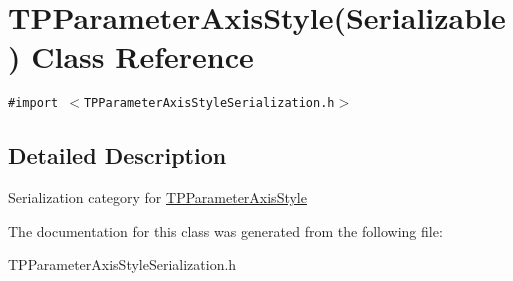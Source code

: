 \hypertarget{interface_t_p_parameter_axis_style_07_serializable_08}{
\section{TPParameterAxisStyle(Serializable) Class Reference}
\label{interface_t_p_parameter_axis_style_07_serializable_08}
}
{\tt \#import $<$TPParameterAxisStyleSerialization.h$>$}



\subsection{Detailed Description}
Serialization category for \hyperlink{interface_t_p_parameter_axis_style}{TPParameterAxisStyle} 

The documentation for this class was generated from the following file:\begin{CompactItemize}
\item 
TPParameterAxisStyleSerialization.h\end{CompactItemize}
